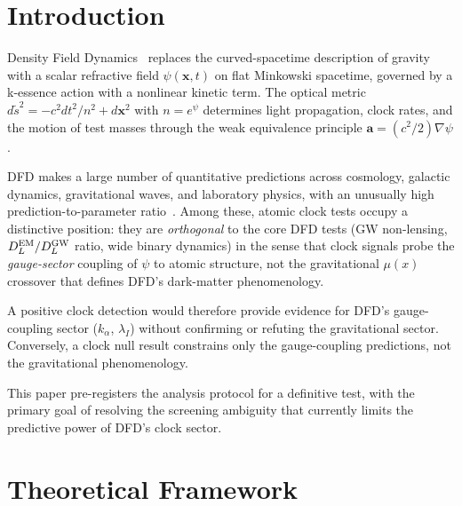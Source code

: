 \documentclass[twocolumn,showpacs,preprintnumbers,amsmath,amssymb,prd]{revtex4-2}
\newcommand{\kalpha}{k_\alpha}
\begin{document}
\maketitle

\section{Introduction}\label{sec:intro}

Density Field Dynamics~\cite{Alcock2025_DFD_v32} replaces the
curved-spacetime description of gravity with a scalar refractive
field $\psi(\mathbf{x},t)$ on flat Minkowski spacetime, governed
by a k-essence action with a nonlinear kinetic term.  The optical
metric $d\tilde{s}^2 = -c^2 dt^2/n^2 + d\mathbf{x}^2$ with
$n = e^\psi$ determines light propagation, clock rates, and the
motion of test masses through the weak equivalence principle
$\mathbf{a} = (c^2/2)\nabla\psi$.

DFD makes a large number of quantitative predictions across
cosmology, galactic dynamics, gravitational waves, and laboratory
physics, with an unusually high prediction-to-parameter
ratio~\cite{Alcock2025_DFD_v32}.
Among these, atomic clock tests occupy a distinctive position:
they are \emph{orthogonal} to the core DFD tests (GW non-lensing,
$D_L^{\rm EM}/D_L^{\rm GW}$ ratio, wide binary dynamics) in the
sense that clock signals probe the \emph{gauge-sector} coupling
of $\psi$ to atomic structure, not the gravitational $\mu(x)$
crossover that defines DFD's dark-matter phenomenology.

A positive clock detection would therefore provide evidence for
DFD's gauge-coupling sector ($\kalpha$, $\lambda_I$) without
confirming or refuting the gravitational sector.  Conversely, a
clock null result constrains only the gauge-coupling predictions,
not the gravitational phenomenology.

This paper pre-registers the analysis protocol for a definitive
test, with the primary goal of resolving the screening ambiguity
that currently limits the predictive power of DFD's clock sector.

\section{Theoretical Framework}\label{sec:theory}
\end{document}
